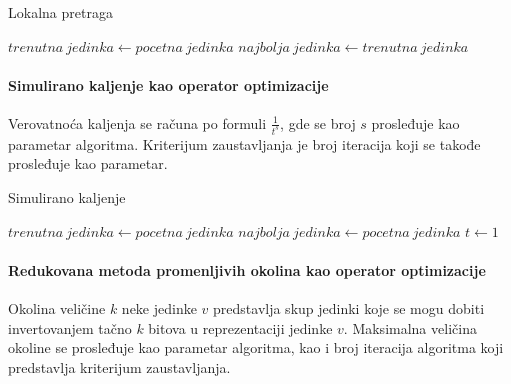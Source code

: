 \documentclass[12pt, a4paper]{article}
\theoremstyle{definition}
\begin{document}
\begin{algorithm}[H]
\caption{Lokalna pretraga}
\label{alg:3}
$trenutna\ jedinka \gets pocetna\ jedinka$\;
$najbolja\ jedinka \gets trenutna\ jedinka$\;
\end{algorithm}

\paragraph{Simulirano kaljenje kao operator optimizacije}

Verovatnoća kaljenja se računa po formuli $\frac{1}{t^s}$, gde se broj $s$ prosleđuje kao parametar algoritma. Kriterijum zaustavljanja je broj iteracija koji se takođe prosleđuje kao parametar.

\vspace{5mm}

\begin{algorithm}[H]
\caption{Simulirano kaljenje}
\label{alg:4}
$trenutna\ jedinka \gets pocetna\ jedinka$\;
$najbolja\ jedinka \gets pocetna\ jedinka$\;
$t \gets 1$\;
\end{algorithm}

\paragraph{Redukovana metoda promenljivih okolina kao operator optimizacije}

Okolina veličine $k$ neke jedinke $v$ predstavlja skup jedinki koje se mogu dobiti invertovanjem tačno $k$ bitova u reprezentaciji jedinke $v$. Maksimalna veličina okoline se prosleđuje kao parametar algoritma, kao i broj iteracija algoritma koji predstavlja kriterijum zaustavljanja.

\vspace{5mm}
\end{document}
